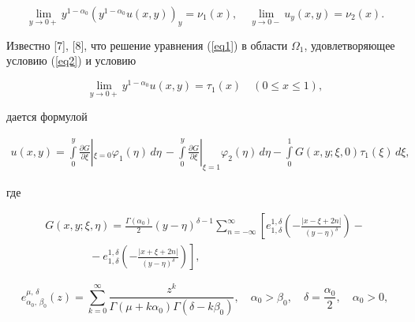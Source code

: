 \[

\lim_{y \to 0+} y^{1-\alpha_{0}} \left( y^{1-\alpha_{0}}  u(x,y) \right)_{y} = \nu_{1}(x), \quad \lim_{y \to 0-} u_{y}(x,y) =\nu_{2}(x).

\]











Известно [7], [8], что решение уравнения (\ref{eq1}) в области $\Omega_{1}$, удовлетворяющее условию (\ref{eq2}) и условию

\[

\lim_{y \to 0+} y^{1-\alpha_{0}} u(x,y) = \tau_{1}(x) \quad (0 \leqslant x \leqslant 1),

\]

дается формулой

\begin{equation}

       \label{eq6}{\begin{array}{l}

\displaystyle u(x,y) = \int\limits_{0}^{y}\frac{\partial G}{\partial \xi}|_{\xi=0} \varphi_{1} (\eta)  \, d \eta \, - \int\limits_{0}^{y} \frac{\partial G}{\partial \xi}|_{\xi=1} \varphi_{2} (\eta) \, d \eta - \int\limits_{0}^{1} G(x,y; \xi,0) \tau_{1}( \xi) \, d \xi ,

\end{array}}

\end{equation}

\noindent где

\[

{\begin{array}{l}

\displaystyle G(x,y; \xi, \eta) = \frac{\Gamma(\alpha_{0})}{2} (y- \eta)^{\delta-1}\sum_{n=- \infty}^{ \infty} \left[ e_{1, \delta}^{1, \delta} \left( - \frac{|x- \xi +2n|}{(y- \eta)^{\delta}} \right) - \right. \\

\displaystyle \quad\quad\quad\quad - \left. e_{1, \delta}^{1, \delta} \left( - \frac{|x+ \xi +2n|}{(y- \eta)^{\delta}} \right) \right],

\end{array}}

\]

\[

e^{\mu, \, \delta}_{\alpha_{0}, \,\beta_{0}}(z)= \sum_{k=0}^{ \infty} \frac{z^{k}}{ \Gamma(\mu+k \alpha_{0}) \Gamma(\delta-k \beta_{0})}, \quad \alpha_{0}>\beta_{0}, \quad \delta=\frac{\alpha_{0}}{2}, \quad \alpha_{0}>0,

\]

